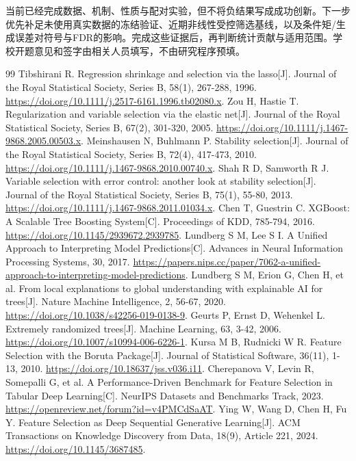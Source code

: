 \documentclass[UTF8,11pt,a4paper]{ctexart}
\begin{document}
当前已经完成数据、机制、性质与配对实验，但不将负结果写成成功创新。下一步优先补足未使用真实数据的冻结验证、近期非线性受控筛选基线，以及条件矩/生成误差对符号与FDR的影响。完成这些证据后，再判断统计贡献与适用范围。学校开题意见和签字由相关人员填写，不由研究程序预填。
\begin{thebibliography}{99}
 Tibshirani R. Regression shrinkage and selection via the lasso[J]. Journal of the Royal Statistical Society, Series B, 58(1), 267-288, 1996. \url{https://doi.org/10.1111/j.2517-6161.1996.tb02080.x}.
 Zou H, Hastie T. Regularization and variable selection via the elastic net[J]. Journal of the Royal Statistical Society, Series B, 67(2), 301-320, 2005. \url{https://doi.org/10.1111/j.1467-9868.2005.00503.x}.
 Meinshausen N, Buhlmann P. Stability selection[J]. Journal of the Royal Statistical Society, Series B, 72(4), 417-473, 2010. \url{https://doi.org/10.1111/j.1467-9868.2010.00740.x}.
 Shah R D, Samworth R J. Variable selection with error control: another look at stability selection[J]. Journal of the Royal Statistical Society, Series B, 75(1), 55-80, 2013. \url{https://doi.org/10.1111/j.1467-9868.2011.01034.x}.
 Chen T, Guestrin C. XGBoost: A Scalable Tree Boosting System[C]. Proceedings of KDD, 785-794, 2016. \url{https://doi.org/10.1145/2939672.2939785}.
 Lundberg S M, Lee S I. A Unified Approach to Interpreting Model Predictions[C]. Advances in Neural Information Processing Systems, 30, 2017. \url{https://papers.nips.cc/paper/7062-a-unified-approach-to-interpreting-model-predictions}.
 Lundberg S M, Erion G, Chen H, et al. From local explanations to global understanding with explainable AI for trees[J]. Nature Machine Intelligence, 2, 56-67, 2020. \url{https://doi.org/10.1038/s42256-019-0138-9}.
 Geurts P, Ernst D, Wehenkel L. Extremely randomized trees[J]. Machine Learning, 63, 3-42, 2006. \url{https://doi.org/10.1007/s10994-006-6226-1}.
 Kursa M B, Rudnicki W R. Feature Selection with the Boruta Package[J]. Journal of Statistical Software, 36(11), 1-13, 2010. \url{https://doi.org/10.18637/jss.v036.i11}.
 Cherepanova V, Levin R, Somepalli G, et al. A Performance-Driven Benchmark for Feature Selection in Tabular Deep Learning[C]. NeurIPS Datasets and Benchmarks Track, 2023. \url{https://openreview.net/forum?id=v4PMCdSaAT}.
 Ying W, Wang D, Chen H, Fu Y. Feature Selection as Deep Sequential Generative Learning[J]. ACM Transactions on Knowledge Discovery from Data, 18(9), Article 221, 2024. \url{https://doi.org/10.1145/3687485}.

\end{thebibliography}
\end{document}
